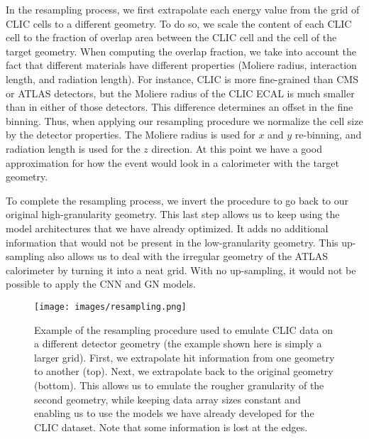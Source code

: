 In the resampling process, we first extrapolate each energy value from the grid of CLIC cells to a different geometry. To do so, we scale the content of each CLIC cell to the fraction of overlap area between the CLIC cell and the cell of the target geometry. When computing the overlap fraction, we take into account the fact that different materials have different properties (Moliere radius, interaction length, and radiation length). For instance, CLIC is more fine-grained than CMS or ATLAS detectors, but the Moliere radius of the CLIC ECAL is much smaller than in either of those detectors. This difference determines an offset in the fine binning. Thus, when applying our resampling procedure we normalize the cell size by the detector properties. The Moliere radius is used for $x$ and $y$ re-binning, and radiation length is used for the $z$ direction. At this point we have a good approximation for how the event would look in a calorimeter with the target geometry.

To complete the resampling process, we invert the procedure to go back to our original high-granularity geometry. This last step allows us to keep using the model architectures that we have already optimized. It adds no additional information that would not be present in the low-granularity geometry. This up-sampling also allows us to deal with the irregular geometry of the ATLAS calorimeter by turning it into a neat grid. With no up-sampling, it would not be possible to apply the CNN and GN models.

\begin{figure}[htbp]
    \centering
    \texttt{[image: images/resampling.png]}
    \caption{Example of the resampling procedure used to emulate CLIC data on a different detector geometry (the example shown here is simply a larger grid). First, we extrapolate hit information from one geometry to another (top). Next, we extrapolate back to the original geometry (bottom). This allows us to emulate the rougher granularity of the second geometry, while keeping data array sizes constant and enabling us to use the models we have already developed for the CLIC dataset. Note that some information is lost at the edges.}
    \label{fig:resampling}
\end{figure}


